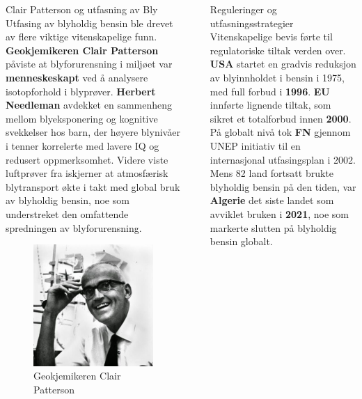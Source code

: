 \documentclass[final]{beamer}
\newlength{\sepwidth}
\newlength{\colwidth}
\newcommand{\separatorcolumn}{\begin{column}{\sepwidth}\end{column}}
\begin{document}
\begin{frame}[t]
\begin{columns}[t]
\begin{column}{\colwidth}
			\begin{block}{Clair Patterson og utfasning av Bly}
				Utfasing av blyholdig bensin ble drevet av flere viktige vitenskapelige funn.
				\textbf{Geokjemikeren Clair Patterson} påviste at blyforurensning i miljøet var
				\textbf{menneskeskapt} ved å analysere isotopforhold i blyprøver. \textbf{Herbert Needleman}
				avdekket en sammenheng mellom blyeksponering og kognitive svekkelser hos barn, der høyere
				blynivåer i tenner korrelerte med lavere IQ og redusert oppmerksomhet. Videre viste
				luftprøver fra iskjerner at atmosfærisk blytransport økte i takt med global bruk av
				blyholdig bensin, noe som understreket den omfattende spredningen av blyforurensning.

				\begin{figure}[h!]
					\centering
					\vspace{0.5cm}
					\includegraphics[width=10cm]{./assets/clair-patterson.jpg}
					\caption{Geokjemikeren Clair Patterson}
				\end{figure}

			\end{block}
		\end{column}

		\separatorcolumn

		\begin{column}{\colwidth}

			\begin{block}{Reguleringer og utfasningsstrategier}
				Vitenskapelige bevis førte til regulatoriske tiltak verden over. \textbf{USA} startet en
				gradvis reduksjon av blyinnholdet i bensin i 1975, med full forbud i \textbf{1996}.
				\textbf{EU} innførte lignende tiltak, som sikret et totalforbud innen \textbf{2000}. På
				globalt nivå tok \textbf{FN} gjennom UNEP initiativ til en internasjonal utfasingsplan i
				2002. Mens 82 land fortsatt brukte blyholdig bensin på den tiden, var \textbf{Algerie} det
				siste landet som avviklet bruken i \textbf{2021}, noe som markerte slutten på blyholdig
				bensin globalt.


\end{block}
\end{column}
\end{columns}
\end{frame}
\end{document}
